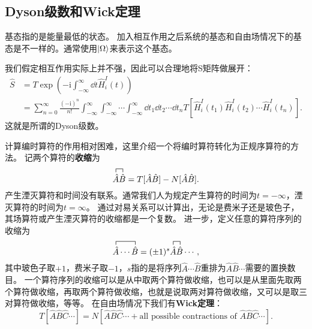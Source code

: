 \documentclass[hyperref, UTF8, a4paper]{ctexart}
\newcommand*{\ii}{\mathrm{i}}
\begin{document}
\subsection{Dyson级数和Wick定理}

基态指的是能量最低的状态。
加入相互作用之后系统的基态和自由场情况下的基态是不一样的。通常使用$\ket{\Omega}$来表示这个基态。

我们假定相互作用实际上并不强，因此可以合理地将S矩阵做展开：
\begin{equation}
    \begin{aligned}
        \hat{S} &= T \exp \left( - \ii \int_{-\infty}^\infty \dd{t} \hat{H}_i^I(t) \right) \\
        &= \sum_{n=0}^\infty \frac{(-\ii)^n}{n!} \int_{-\infty}^\infty \int_{-\infty}^\infty \cdots \int_{-\infty}^\infty \dd{t_1} \dd{t_2} \cdots \dd{t_n} T [\hat{H}_i^I(t_1) \hat{H}_i^I(t_2) \cdots \hat{H}_i^I(t_n)].
    \end{aligned} 
    \label{eq:dyson-series}
\end{equation}
这就是所谓的Dyson级数。

计算编时算符的作用相对困难，这里介绍一个将编时算符转化为正规序算符的方法。
记两个算符的\textbf{收缩}为
\begin{equation}
    {\contraction{}{\hat{A}}{}{\hat{B}} \hat{A}\hat{B}} = T[\hat{A} \hat{B}] - N[\hat{A} \hat{B}].
\end{equation}
产生湮灭算符和时间没有联系。通常我们人为规定产生算符的时间为$t=-\infty$，湮灭算符的时间为$t=\infty$。
通过对易关系可以计算出，无论是费米子还是玻色子，其场算符或产生湮灭算符的收缩都是一个复数。
进一步，定义任意的算符序列的收缩为
\begin{equation}
    {\contraction{}{\hat{A}}{\cdots}{\hat{B}} \hat{A} \cdots \hat{B}} = (\pm 1)^s {\contraction{}{\hat{A}}{}{\hat{B}} \hat{A}\hat{B}} \cdots,
\end{equation}
其中玻色子取$+1$，费米子取$-1$，$s$指的是将序列$\hat{A} \cdots \hat{B}$重排为$\hat{A}\hat{B} \cdots$需要的置换数目。
一个算符序列的收缩可以是从中取两个算符做收缩，也可以是从里面先取两个算符做收缩，再取两个算符做收缩，也就是说取两对算符做收缩，又可以是取三对算符做收缩，等等。
在自由场情况下我们有\textbf{Wick定理}：
\begin{equation}
    T[\hat{A} \hat{B} \hat{C} \cdots] = N[\hat{A} \hat{B} \hat{C} \cdots + \text{all possible contractions of } \hat{A} \hat{B} \hat{C} \cdots].
\end{equation}
\end{document}
